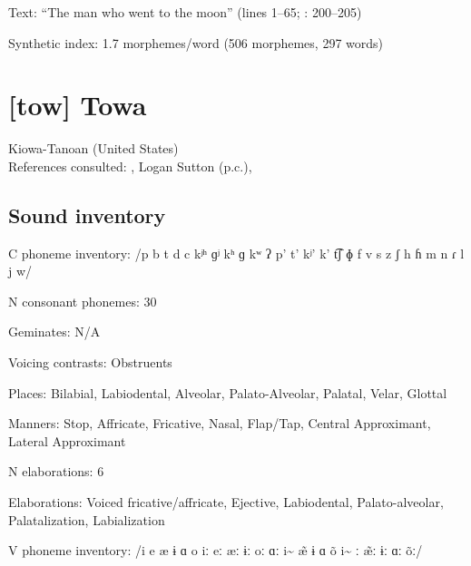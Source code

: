 {\begin{appendixdesc}

\item[Text:] “The man who went to the moon” (lines 1--65; \citealt{ThompsonThompson1992}: 200--205)

\item[Synthetic index:] 1.7 morphemes/word (506 morphemes, 297 words)
\end{appendixdesc}

\section*{[tow] Towa}  %
Kiowa-Tanoan (United States)\medskip\\
References consulted: \citet{Bell1993}, Logan Sutton (p.c.), \citet{Yumitani1998}

\subsection*{Sound inventory}
\begin{appendixdesc}

\item[C phoneme inventory:] /p b t d c kʲʰ ɡʲ kʰ ɡ kʷ ʔ p’ t’ kʲ’ k’ t͡ʃ ɸ f v s z ʃ h ɦ m n ɾ l j w/

\item[N consonant phonemes:] 30

\item[Geminates:] N/A

\item[Voicing contrasts:] Obstruents

\item[Places:] Bilabial, Labiodental, Alveolar, Palato-Alveolar, Palatal, Velar, Glottal

\item[Manners:] Stop, Affricate, Fricative, Nasal, Flap/Tap, Central Approximant, Lateral Approximant

\item[N elaborations:] 6

\item[Elaborations:] Voiced fricative/affricate, Ejective, Labiodental, Palato-alveolar, Palatalization, Labialization

\item[V phoneme inventory:] /i e æ ɨ ɑ o iː eː æː ɨː oː ɑː i\~{}  \~{æ} ɨ ɑ õ i\~{} ː \~{æ}ː ɨː ɑː õː/


\end{appendixdesc}}
